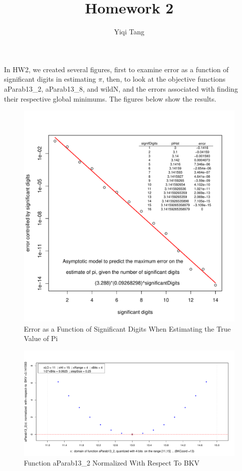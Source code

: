 \documentclass[11pt, oneside]{article}
\title{Homework 2}
\author{Yiqi Tang}
\begin{document}
\maketitle

\vspace*{3ex}
\noindent
In HW2, we created several figures, first to examine error as a function of significant digits in estimating $\pi$, then, to look at the objective functions aParab13\_2, aParab13\_8, and wildN, and the errors associated with finding their respective global minimums. The figures below show the results. 


   \begin{figure}
     \centering
     \includegraphics[width=1\linewidth]{fg_asym_pi_digits.pdf}
    \caption{Error as a Function of Significant Digits When Estimating the True Value of Pi}
   \end{figure}
   
   \begin{figure}
     \centering
     \includegraphics[width=1\linewidth]{fg_OF_aParab13_2_quant_exh.pdf}
    \caption{Function aParab13\_2 Normalized With Respect To BKV}
   \end{figure}
   
\end{document}
